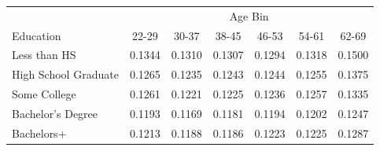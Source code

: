 \begin{tabular}{lcccccc}
\hline\hline
 & \multicolumn{6}{c}{Age Bin} \\
Education & 22-29 & 30-37 & 38-45 & 46-53 & 54-61 & 62-69 \\
\hline
Less than HS&0.1344&0.1310&0.1307&0.1294&0.1318&0.1500\\
High School Graduate&0.1265&0.1235&0.1243&0.1244&0.1255&0.1375\\
Some College&0.1261&0.1221&0.1225&0.1236&0.1257&0.1335\\
Bachelor's Degree&0.1193&0.1169&0.1181&0.1194&0.1202&0.1247\\
Bachelors+&0.1213&0.1188&0.1186&0.1223&0.1225&0.1287\\
\hline\hline
\end{tabular}
